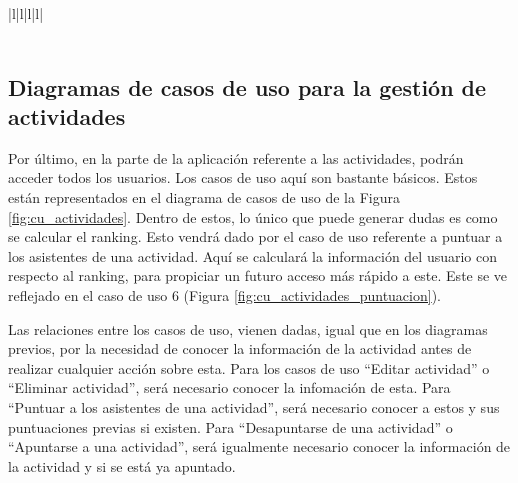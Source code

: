 \begin{table}[hp!]
{\begin{tabular}{|l|l|l|l|}
        \hline
                                                                                                                                                                                                                                \\ 
        \hline
                                                                                                                                                \\
        \hline
        \end{tabular}
    }
    \caption{Curso de eventos del caso de uso 5}
\end{table}

\newpage

\subsection{Diagramas de casos de uso para la gestión de actividades}

Por último, en la parte de la aplicación referente a las actividades, podrán acceder todos los usuarios. Los casos de uso aquí son bastante básicos. Estos están representados en el diagrama de casos de uso de la Figura \ref{fig:cu_actividades}. Dentro de estos, lo único que puede generar dudas es como se calcular el ranking. Esto vendrá dado por el caso de uso referente a puntuar a los asistentes de una actividad. Aquí se calculará la información del usuario con respecto al ranking, para propiciar un futuro acceso más rápido a este. Este se ve reflejado en el caso de uso 6 (Figura \ref{fig:cu_actividades_puntuacion}).

Las relaciones entre los casos de uso, vienen dadas, igual que en los diagramas previos, por la necesidad de conocer la información de la actividad antes de realizar cualquier acción sobre esta. Para los casos de uso ``Editar actividad'' o ``Eliminar actividad'', será necesario conocer la infomación de esta. Para ``Puntuar a los asistentes de una actividad'', será necesario conocer a estos y sus puntuaciones previas si existen. Para ``Desapuntarse de una actividad'' o ``Apuntarse a una actividad'', será igualmente necesario conocer la información de la actividad y si se está ya apuntado. 

